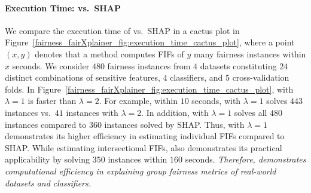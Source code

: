 \paragraph{Execution Time: {\fairXplainer} vs.\ SHAP} We compare the execution time of {\fairXplainer} vs.\ SHAP in a cactus plot in Figure~\ref{fairness_fairXplainer_fig:execution_time_cactus_plot}, where a point $ (x, y) $ denotes that a method computes FIFs of $ y $ many fairness instances within $ x $ seconds. We consider $ 480 $ fairness instances from $ 4 $ datasets constituting $ 24 $ distinct combinations of sensitive features, $ 4 $ classifiers, and $ 5 $ cross-validation folds. In Figure~\ref{fairness_fairXplainer_fig:execution_time_cactus_plot},  {\fairXplainer} with $ \lambda = 1 $ is faster than  $ \lambda = 2 $. For example, within $ 10 $ seconds, {\fairXplainer} with $ \lambda = 1 $ solves $ 443 $ instances vs.\ $ 41 $ instances with $ \lambda = 2 $.  In addition, {\fairXplainer} with $ \lambda = 1 $ solves all $ 480 $ instances compared to $ 360 $ instances solved by SHAP. Thus, {\fairXplainer} with $ \lambda = 1 $ demonstrates its higher efficiency in estimating individual FIFs compared to SHAP. While estimating intersectional FIFs, {\fairXplainer} also demonstrates its practical applicability by solving $ 350 $ instances within  $ 160 $ seconds. \textit{Therefore, {\fairXplainer} demonstrates computational efficiency in explaining group fairness metrics of real-world datasets and classifiers.}


